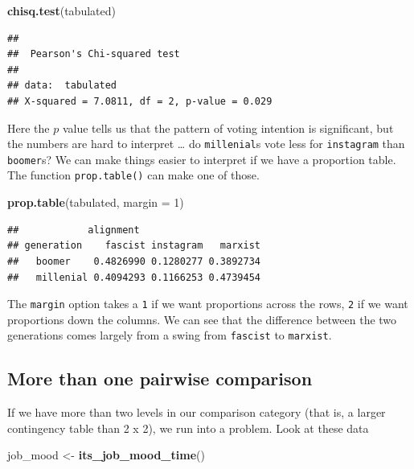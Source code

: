 \documentclass[
]{book}
\newenvironment{Shaded}{\begin{snugshade}}{\end{snugshade}}
\newcommand{\DataTypeTok}[1]{\textcolor[rgb]{0.13,0.29,0.53}{#1}}
\newcommand{\DecValTok}[1]{\textcolor[rgb]{0.00,0.00,0.81}{#1}}
\newcommand{\KeywordTok}[1]{\textcolor[rgb]{0.13,0.29,0.53}{\textbf{#1}}}
\newcommand{\NormalTok}[1]{#1}
\newcommand{\StringTok}[1]{\textcolor[rgb]{0.31,0.60,0.02}{#1}}
\begin{document}
\begin{Shaded}
\begin{Highlighting}[]
\KeywordTok{chisq.test}\NormalTok{(tabulated)}
\end{Highlighting}
\end{Shaded}

\begin{verbatim}
## 
## 	Pearson's Chi-squared test
## 
## data:  tabulated
## X-squared = 7.0811, df = 2, p-value = 0.029
\end{verbatim}

Here the \(p\) value tells us that the pattern of voting intention is significant, but the numbers are hard to interpret \ldots{} do \texttt{millenial}s vote less for \texttt{instagram} than \texttt{boomer}s? We can make things easier to interpret if we have a proportion table. The function \texttt{prop.table()} can make one of those.

\begin{Shaded}
\begin{Highlighting}[]
\KeywordTok{prop.table}\NormalTok{(tabulated, }\DataTypeTok{margin =} \DecValTok{1}\NormalTok{)}
\end{Highlighting}
\end{Shaded}

\begin{verbatim}
##            alignment
## generation    fascist instagram   marxist
##   boomer    0.4826990 0.1280277 0.3892734
##   millenial 0.4094293 0.1166253 0.4739454
\end{verbatim}

The \texttt{margin} option takes a \texttt{1} if we want proportions across the rows, \texttt{2} if we want proportions down the columns. We can see that the difference between the two generations comes largely from a swing from \texttt{fascist} to \texttt{marxist}.

\hypertarget{more-than-one-pairwise-comparison}{%
\subsection{More than one pairwise comparison}\label{more-than-one-pairwise-comparison}}

If we have more than two levels in our comparison category (that is, a larger contingency table than 2 x 2), we run into a problem. Look at these data

\begin{Shaded}
\begin{Highlighting}[]
\NormalTok{job_mood <-}\StringTok{ }\KeywordTok{its_job_mood_time}\NormalTok{()}
\end{Highlighting}
\end{Shaded}
\end{document}
